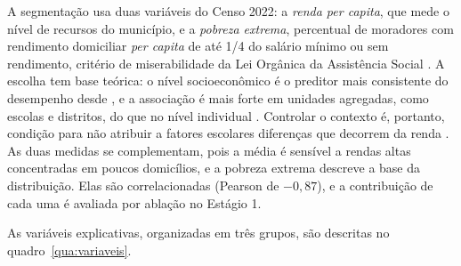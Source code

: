 A segmentação usa duas variáveis do Censo 2022: a \textit{renda per capita}, que mede o nível de recursos do município, e a \textit{pobreza extrema}, percentual de moradores com rendimento domiciliar \textit{per capita} de até 1/4 do salário mínimo ou sem rendimento, critério de miserabilidade da Lei Orgânica da Assistência Social \parencite{brasil1993}. A escolha tem base teórica: o nível socioeconômico é o preditor mais consistente do desempenho desde \textcite{coleman1966}, e a associação é mais forte em unidades agregadas, como escolas e distritos, do que no nível individual \parencite{sirin2005}. Controlar o contexto é, portanto, condição para não atribuir a fatores escolares diferenças que decorrem da renda \parencite{albernaz2002}. As duas medidas se complementam, pois a média é sensível a rendas altas concentradas em poucos domicílios, e a pobreza extrema descreve a base da distribuição. Elas são correlacionadas (Pearson de $-0{,}87$), e a contribuição de cada uma é avaliada por ablação no Estágio 1.

As variáveis explicativas, organizadas em três grupos, são descritas no quadro~\ref{qua:variaveis}.

